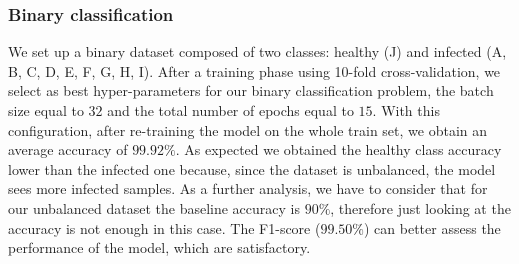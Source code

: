 \subsubsection{Binary classification}
We set up a binary dataset composed of two classes: healthy (J) and infected (A, B, C, D, E, F, G, H, I). After a training phase using 10-fold cross-validation, we select as best hyper-parameters for our binary classification problem, the batch size equal to $32$ and the total number of epochs equal to $15$. With this configuration, after re-training the model on the whole train set, we obtain an average accuracy of $99.92\%$. As expected we obtained the healthy class accuracy lower than the infected one because, since the dataset is unbalanced, the model sees more infected samples. As a further analysis, we have to consider that for our unbalanced dataset the baseline accuracy is $90\%$, therefore just looking at the accuracy is not enough in this case. The F1-score ($99.50\%$) can better assess the performance of the model, which are satisfactory.
